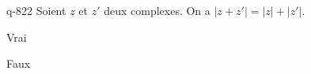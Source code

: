 \begin{truefalse}{q-822}
Soient $z$ et $z'$ deux complexes. On a $|z+z'| = |z| + |z'|$.
\item Vrai
\item* Faux
\end{truefalse}

